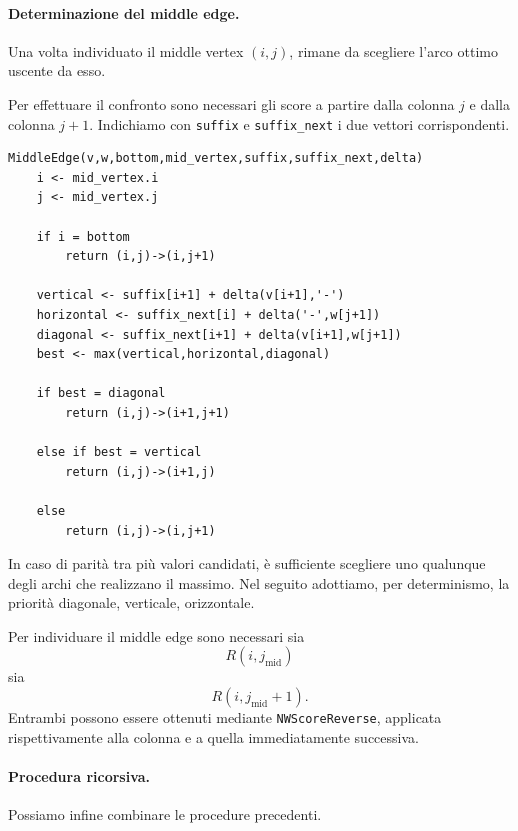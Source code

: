\paragraph{Determinazione del middle edge.}

Una volta individuato il middle vertex $(i,j)$, rimane da scegliere l'arco ottimo uscente da esso.

Per effettuare il confronto sono necessari gli score a partire dalla colonna $j$ e dalla colonna $j+1$.
Indichiamo con \texttt{suffix} e \texttt{suffix\_next} i due vettori corrispondenti.

\begin{codeblock}
\begin{lstlisting}[style=pseudo,caption={Determinazione del middle edge}]
MiddleEdge(v,w,bottom,mid_vertex,suffix,suffix_next,delta)
    i <- mid_vertex.i
    j <- mid_vertex.j

    if i = bottom
        return (i,j)->(i,j+1)

    vertical <- suffix[i+1] + delta(v[i+1],'-')
    horizontal <- suffix_next[i] + delta('-',w[j+1])
    diagonal <- suffix_next[i+1] + delta(v[i+1],w[j+1])
    best <- max(vertical,horizontal,diagonal)

    if best = diagonal
        return (i,j)->(i+1,j+1)

    else if best = vertical 
        return (i,j)->(i+1,j)

    else
        return (i,j)->(i,j+1)
\end{lstlisting}
\end{codeblock}
In caso di parità tra più valori candidati, è sufficiente scegliere uno qualunque degli
archi che realizzano il massimo. Nel seguito adottiamo, per determinismo, la priorità
diagonale, verticale, orizzontale.

Per individuare il middle edge sono necessari sia
\[
    R(i,j_{\mathrm{mid}})
\]
sia
\[
    R(i,j_{\mathrm{mid}}+1).
\]
Entrambi possono essere ottenuti mediante \texttt{NWScoreReverse}, applicata rispettivamente alla colonna
e a quella immediatamente successiva.

\paragraph{Procedura ricorsiva.}

Possiamo infine combinare le procedure precedenti.

